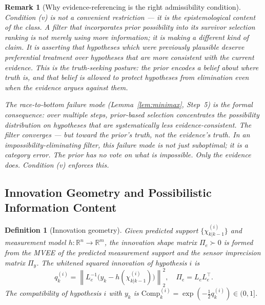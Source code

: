 \documentclass[12pt]{article}
\newtheorem{definition}[theorem]{Definition}
\newtheorem{remark}[theorem]{Remark}
\begin{document}
\begin{remark}[Why evidence-referencing is the right admissibility condition]
Condition (v) is not a convenient restriction --- it is the epistemological content of the class. A filter that incorporates prior possibility into its survivor selection ranking is not merely using more information; it is making a different kind of claim. It is asserting that hypotheses which were previously plausible deserve preferential treatment over hypotheses that are more consistent with the current evidence. This is the truth-seeking posture: the prior encodes a belief about where truth is, and that belief is allowed to protect hypotheses from elimination even when the evidence argues against them.

The race-to-bottom failure mode (Lemma~\ref{lem:minimax}, Step~5) is the formal consequence: over multiple steps, prior-based selection concentrates the possibility distribution on hypotheses that are systematically less evidence-consistent. The filter converges --- but toward the prior's truth, not the evidence's truth. In an impossibility-eliminating filter, this failure mode is not just suboptimal; it is a category error. The prior has no vote on what is impossible. Only the evidence does. Condition (v) enforces this.
\end{remark}

\subsection{Innovation Geometry and Possibilistic Information Content}

\begin{definition}[Innovation geometry]
\label{def:innovation}
Given predicted support $\{\chi^{(i)}_{k|k-1}\}$ and measurement model
$h : \mathbb{R}^n \to \mathbb{R}^m$, the innovation shape matrix $\Pi_e \succ 0$ is formed from the MVEE of the predicted
measurement support and the sensor imprecision matrix $\Pi_y$. The whitened squared innovation of
hypothesis $i$ is
\begin{equation}
q^{(i)}_k = \left\|L_e^{-1}\bigl(y_k - h(\chi^{(i)}_{k|k-1})\bigr)\right\|_2^2,\quad \Pi_e = L_e L_e^\top.
\end{equation}
The compatibility of hypothesis $i$ with $y_k$ is $\mathrm{Comp}^{(i)}_k = \exp(-\frac{1}{2}q^{(i)}_k) \in (0,1]$.
\end{definition}
\end{document}
